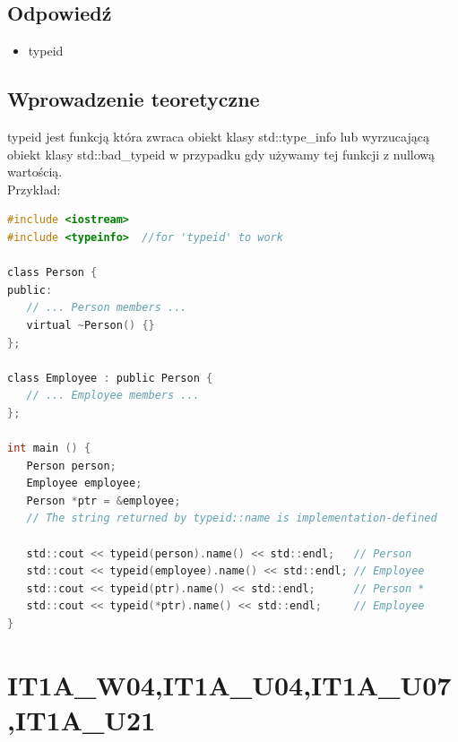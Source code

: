 \subsection{Odpowiedź}
\begin{itemize}
\item typeid
\end{itemize}

\subsection{Wprowadzenie teoretyczne}
typeid jest funkcją która zwraca obiekt klasy std::type\_info lub wyrzucającą obiekt klasy std::bad\_typeid w przypadku gdy używamy tej funkcji z nullową wartością.\\
Przykład:
\begin{lstlisting}[language=c]
#include <iostream>
#include <typeinfo>  //for 'typeid' to work

class Person {
public:
   // ... Person members ...
   virtual ~Person() {}
};

class Employee : public Person {
   // ... Employee members ...
};

int main () {
   Person person;
   Employee employee;
   Person *ptr = &employee;
   // The string returned by typeid::name is implementation-defined
   
   std::cout << typeid(person).name() << std::endl;   // Person
   std::cout << typeid(employee).name() << std::endl; // Employee
   std::cout << typeid(ptr).name() << std::endl;      // Person * 
   std::cout << typeid(*ptr).name() << std::endl;     // Employee
}
\end{lstlisting}


\section{IT1A\_W04,IT1A\_U04,IT1A\_U07,IT1A\_U21}
